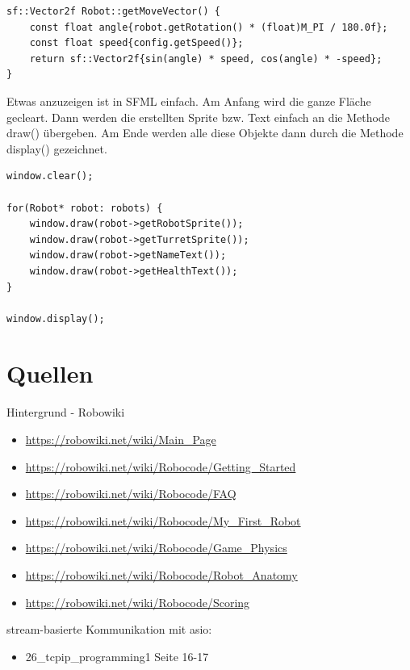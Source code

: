 \documentclass{article}
\begin{document}
\begin{verbatim}
sf::Vector2f Robot::getMoveVector() {
    const float angle{robot.getRotation() * (float)M_PI / 180.0f};
    const float speed{config.getSpeed()};
    return sf::Vector2f{sin(angle) * speed, cos(angle) * -speed};
}
\end{verbatim}

Etwas anzuzeigen ist in SFML einfach. Am Anfang wird die ganze Fläche gecleart. Dann werden die erstellten Sprite bzw. Text einfach an die Methode draw() übergeben. Am Ende werden alle diese Objekte dann durch die Methode display() gezeichnet.

\begin{verbatim}
window.clear();

for(Robot* robot: robots) {
    window.draw(robot->getRobotSprite());
    window.draw(robot->getTurretSprite());
    window.draw(robot->getNameText());
    window.draw(robot->getHealthText());
}

window.display();
\end{verbatim}


\section{Quellen}

Hintergrund - Robowiki
\begin{itemize}
\item \url{https://robowiki.net/wiki/Main_Page}
\item \url{https://robowiki.net/wiki/Robocode/Getting_Started}
\item \url{https://robowiki.net/wiki/Robocode/FAQ}
\item \url{https://robowiki.net/wiki/Robocode/My_First_Robot}
\item \url{https://robowiki.net/wiki/Robocode/Game_Physics}
\item \url{https://robowiki.net/wiki/Robocode/Robot_Anatomy}
\item \url{https://robowiki.net/wiki/Robocode/Scoring}
\end{itemize}
stream-basierte Kommunikation mit asio:
\begin{itemize}
\item 26\_tcpip\_programming1 Seite 16-17
\end{itemize}
\end{document}
